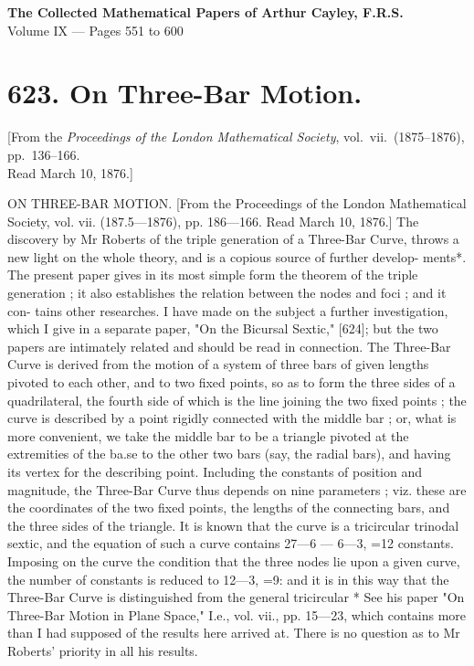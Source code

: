 \documentclass[12pt,a4paper]{article}
\begin{document}
\begin{center}
{\Large\bfseries The Collected Mathematical Papers of Arthur Cayley, F.R.S.}\\[6pt]
{\large Volume IX --- Pages 551 to 600}
\end{center}

\tableofcontents
\newpage

\section*{623. On Three-Bar Motion.}

\begin{center}
\small[From the \textit{Proceedings of the London Mathematical Society}, vol.~vii.\ (1875--1876), pp.~136--166.\\Read March 10, 1876.]
\end{center}

ON THREE-BAR
MOTION.
[From the Proceedings of the London Mathematical
Society,
vol.
vii.
(187.5---1876),
pp. 186---166.
Read March
10,
1876.]
The
discovery
by Mr
Roberts
of
the
triple
generation
of
a
Three-Bar
Curve,
throws
a new
light
on
the
whole
theory,
and
is a
copious
source
of
further
develop-
ments*.
The
present paper
gives
in
its
most
simple
form
the
theorem
of
the
triple
generation
;
it
also
establishes
the
relation
between
the
nodes
and
foci
;
and
it
con-
tains
other
researches.
I
have
made
on
the
subject
a
further
investigation,
which
I
give
in
a
separate
paper, "On
the
Bicursal
Sextic," [624];
but
the
two
papers
are
intimately related and should be read
in
connection.
The
Three-Bar
Curve
is
derived
from
the
motion
of a
system
of
three
bars
of
given
lengths
pivoted
to
each
other, and
to
two
fixed
points,
so
as
to form
the three
sides
of
a
quadrilateral,
the
fourth
side
of
which
is
the
line
joining
the
two
fixed
points
;
the
curve
is
described
by a
point
rigidly
connected
with
the middle
bar
;
or,
what
is
more
convenient,
we
take
the
middle
bar
to
be
a
triangle
pivoted
at
the
extremities
of
the
ba.se
to
the
other
two
bars
(say,
the
radial
bars),
and
having
its
vertex
for the describing point.
Including
the
constants
of
position
and
magnitude,
the
Three-Bar
Curve
thus
depends
on
nine
parameters
;
viz.
these
are
the
coordinates
of
the
two
fixed
points,
the
lengths
of the
connecting
bars, and
the
three
sides
of
the
triangle.
It
is known
that the curve
is a
tricircular trinodal
sextic, and the
equation of such a curve contains
27---6 --- 6---3, =12
constants.
Imposing
on
the
curve
the
condition
that
the
three
nodes
lie
upon
a
given
curve,
the
number of
constants
is reduced
to 12---3, =9:
and
it
is
in
this way that the Three-Bar Curve
is distinguished from the general
tricircular
* See
his paper "On Three-Bar
Motion
in
Plane
Space,"
I.e.,
vol.
vii.,
pp.
15---23, which
contains more
than
I
had supposed of
the results
here
arrived
at.
There
is no question as to Mr Roberts' priority in
all his
results.
\end{document}
